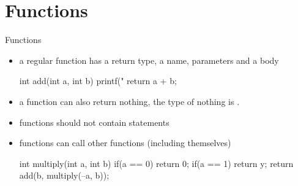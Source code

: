 \documentclass[10pt,graphics,aspectratio=169,table]{beamer}
\begin{document}
\section{Functions}
\begin{frame}[fragile]{Functions}
    \begin{itemize}
        \item
            a regular function has a return type, a name, parameters and a body
            \begin{codeblock}
int add(int a, int b){
    printf("%
    return a + b;
}
            \end{codeblock}
        \item
            a function can also return nothing,
            the type of nothing is .
        \item
             functions should not contain  statements
        \item
            functions can call other functions (including themselves)
            \begin{codeblock}
int multiply(int a, int b){
    if(a == 0) return 0;
    if(a == 1) return y;
    return add(b, multiply(--a, b));
}
            \end{codeblock}
    \end{itemize}

\end{frame}
\end{document}
